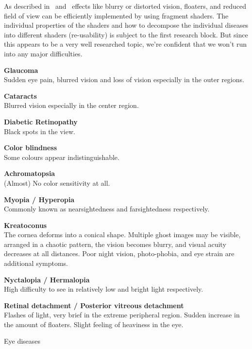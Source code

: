 \documentclass{acm_proc_article-sp}
\begin{document}
As described in \cite{gazedisplays} and \cite{eyediseasesim} effects like
blurry or distorted vision, floaters, and reduced field of view can be
efficiently implemented by using fragment shaders. The individual properties
of the shaders and how to decompose the individual diseases into different
shaders (re-usability) is subject to the first research block. But since this
appears to be a very well researched topic, we're confident that we won't run
into any major difficulties.

\begin{table}
    \textbf{Glaucoma}\\
    Sudden eye pain, blurred vision and loss of vision especially in the
    outer regions.

    \vspace{1em}\textbf{Cataracts}\\
    Blurred vision especially in the center region.

    \vspace{1em}\textbf{Diabetic Retinopathy}\\
    Black spots in the view.

    \vspace{1em}\textbf{Color blindness}\\
    Some colours appear indistinguishable.

    \vspace{1em}\textbf{Achromatopsia}\\
    (Almost) No color sensitivity at all.

    \vspace{1em}\textbf{Myopia / Hyperopia}\\
    Commonly known as nearsightedness and farsightedness respectively.

    \vspace{1em}\textbf{Kreatoconus}\\
    The cornea deforms into a conical shape.
    Multiple ghost images may be visible, arranged in a chaotic pattern,
    the vision becomes blurry, and visual acuity decreases at all distances.
    Poor night vision, photo-phobia, and eye strain are additional symptoms.

    \vspace{1em}\textbf{Nyctalopia / Hermalopia}\\
    High difficulty to see in relatively low and bright light respectively.

    \vspace{1em}\textbf{Retinal detachment / Posterior vitreous detachment}\\
    Flashes of light, very brief in the extreme peripheral region.
    Sudden increase in the amount of floaters.
    Slight feeling of heaviness in the eye.
    \caption{Eye diseases}
    \label{tab:eye_diseases}
\end{table}
\end{document}
